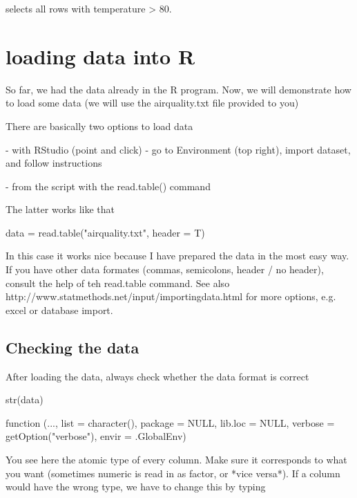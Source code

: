 \documentclass[a4paper,twoside]{tufte-book}\usepackage[]{graphicx}\usepackage[]{color}
\begin{document}
\begin{appendices}
selects all rows with temperature > 80.


\section{loading data into R}

So far, we had the data already in the R program. Now, we will demonstrate how to load some data (we will use the airquality.txt file provided to you)

There are basically two options to load data

- with RStudio (point and click) - go to Environment (top right), import dataset, and follow instructions

- from the script with the read.table() command

The latter works like that


\begin{Schunk}
\begin{Sinput}
data = read.table("airquality.txt", header = T)
\end{Sinput}
\end{Schunk}

In this case it works nice because I have prepared the data in the most easy way. If you have other data formates (commas, semicolons, header / no header), consult the help of teh read.table command. See also http://www.statmethods.net/input/importingdata.html for more options, e.g. excel or database import. 

\subsection{Checking the data}

After loading the data, always check whether the data format is correct 

\begin{Schunk}
\begin{Sinput}
str(data)
\end{Sinput}
\begin{Soutput}
function (..., list = character(), package = NULL, lib.loc = NULL, 
    verbose = getOption("verbose"), envir = .GlobalEnv)  
\end{Soutput}
\end{Schunk}

You see here the atomic type of every column. Make sure it corresponds to what you want (sometimes numeric is read in as factor, or *vice versa*). If a column would have the wrong type, we have to change this by typing


\end{appendices}
\end{document}
